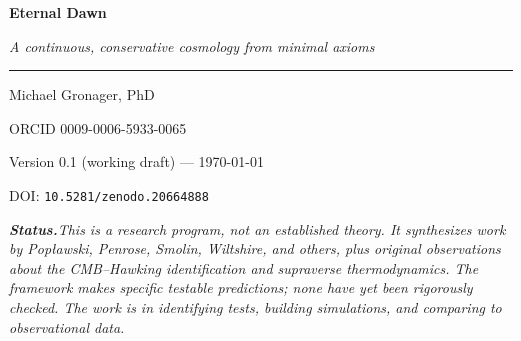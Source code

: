 \begin{titlingpage}
\thispagestyle{empty}
\centering
\vspace*{0.18\textheight}

{\sffamily\bfseries\Huge Eternal Dawn\par}
\vspace{1.4ex}
{\large\itshape A continuous, conservative cosmology from minimal axioms\par}

\vspace{2.2ex}
\rule{0.6\textwidth}{0.4pt}\par
\vspace{2.2ex}

{\large Michael Gronager, PhD\par}
\vspace{0.6ex}
{\small ORCID 0009-0006-5933-0065\par}
\vspace{1.0ex}
{\normalsize Version 0.1 (working draft) --- \today\par}%
\vspace{0.5ex}
{\footnotesize DOI: \texttt{10.5281/zenodo.20664888}\par}

\vfill

\begin{minipage}{0.82\textwidth}
\small\itshape\noindent
\textbf{Status.}\enspace This is a research program, not an established theory.
It synthesizes work by Pop\l{}awski, Penrose, Smolin, Wiltshire, and others, plus
original observations about the CMB--Hawking identification and supraverse
thermodynamics. The framework makes specific testable predictions; none have yet
been rigorously checked. The work is in identifying tests, building simulations,
and comparing to observational data.
\end{minipage}
\vspace{0.08\textheight}
\end{titlingpage}
